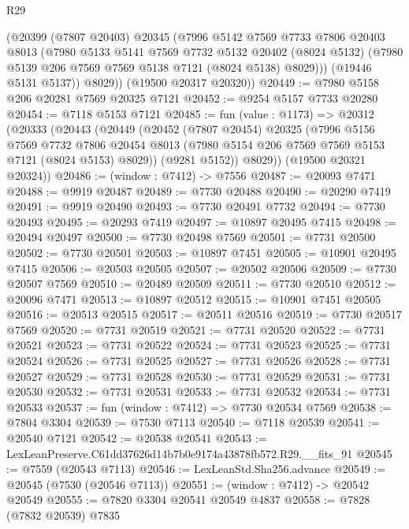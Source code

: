 \begin{lexlean}{R29}
\begin{coremodule}
          (@20399
            (@7807 @20403)
            @20345
            (@7996
              @5142
              @7569
              @7733
              @7806
              @20403
              @8013
              (@7980
                @5133
                @5141
                @7569
                @7732
                @5132
                @20402
                (@8024 @5132)
                (@7980 @5139 @206 @7569 @7569 @5138 @7121 (@8024 @5138) @8029)))
            (@19446 @5131 @5137))
          @8029))
      (@19500 @20317 @20320))
@20449 := @7980 @5158 @206 @20281 @7569 @20325 @7121
@20452 := @9254 @5157 @7733 @20280
@20454 := @7118 @5153 @7121
@20485 := fun (value : @1173) =>
  @20312
    (@20333
      (@20443
        (@20449
          (@20452
            (@7807 @20454)
            @20325
            (@7996
              @5156
              @7569
              @7732
              @7806
              @20454
              @8013
              (@7980 @5154 @206 @7569 @7569 @5153 @7121 (@8024 @5153) @8029))
            (@9281 @5152))
          @8029))
      (@19500 @20321 @20324))
@20486 := (window : @7412) -> @7556
@20487 := @20093 @7471
@20488 := @9919 @20487
@20489 := @7730 @20488
@20490 := @20290 @7419
@20491 := @9919 @20490
@20493 := @7730 @20491 @7732
@20494 := @7730 @20493
@20495 := @20293 @7419
@20497 := @10897 @20495 @7415
@20498 := @20494 @20497
@20500 := @7730 @20498 @7569
@20501 := @7731 @20500
@20502 := @7730 @20501
@20503 := @10897 @7451
@20505 := @10901 @20495 @7415
@20506 := @20503 @20505
@20507 := @20502 @20506
@20509 := @7730 @20507 @7569
@20510 := @20489 @20509
@20511 := @7730 @20510
@20512 := @20096 @7471
@20513 := @10897 @20512
@20515 := @10901 @7451 @20505
@20516 := @20513 @20515
@20517 := @20511 @20516
@20519 := @7730 @20517 @7569
@20520 := @7731 @20519
@20521 := @7731 @20520
@20522 := @7731 @20521
@20523 := @7731 @20522
@20524 := @7731 @20523
@20525 := @7731 @20524
@20526 := @7731 @20525
@20527 := @7731 @20526
@20528 := @7731 @20527
@20529 := @7731 @20528
@20530 := @7731 @20529
@20531 := @7731 @20530
@20532 := @7731 @20531
@20533 := @7731 @20532
@20534 := @7731 @20533
@20537 := fun (window : @7412) => @7730 @20534 @7569
@20538 := @7804 @3304
@20539 := @7530 @7113
@20540 := @7118 @20539
@20541 := @20540 @7121
@20542 := @20538 @20541
@20543 := LexLeanPreserve.C61dd37626d14b7b0e9174a43878fb572.R29.__fits_91
@20545 := @7559 (@20543 @7113)
@20546 := LexLeanStd.Sha256.advance
@20549 := @20545 (@7530 (@20546 @7113))
@20551 := (window : @7412) -> @20542 @20549
@20555 := @7820 @3304 @20541 @20549 @4837
@20558 := @7828 (@7832 @20539) @7835

\end{coremodule}
\end{lexlean}
